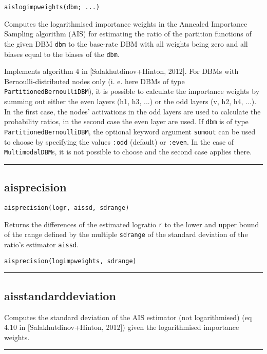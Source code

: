 \begin{verbatim}
aislogimpweights(dbm; ...)
\end{verbatim}
Computes the logarithmised importance weights in the Annealed Importance Sampling algorithm (AIS) for estimating the ratio of the partition functions of the given DBM \texttt{dbm} to the base-rate DBM with all weights being zero and all biases equal to the biases of the \texttt{dbm}.

Implements algorithm 4 in [Salakhutdinov+Hinton, 2012]. For DBMs with Bernoulli-distributed nodes only (i. e. here DBMs of type \texttt{PartitionedBernoulliDBM}), it is possible to calculate the importance weights by summing out either the even layers (h1, h3, ...) or the odd layers (v, h2, h4, ...). In the first case, the nodes' activations in the odd layers are used to calculate the probability ratios, in the second case the even layer are used. If \texttt{dbm} is of type \texttt{PartitionedBernoulliDBM}, the optional keyword argument \texttt{sumout} can be used to choose by specifying the values \texttt{:odd} (default) or \texttt{:even}. In the case of \texttt{MultimodalDBM}s, it is not possible to choose and the second case applies there.

\noindent\rule{\textwidth}{1pt}
\subsection*{aisprecision}
\begin{verbatim}
aisprecision(logr, aissd, sdrange)
\end{verbatim}
Returns the differences of the estimated logratio \texttt{r} to the lower and upper bound of the range defined by the multiple \texttt{sdrange} of the standard deviation of the ratio's estimator \texttt{aissd}.

\begin{verbatim}
aisprecision(logimpweights, sdrange)
\end{verbatim}
\noindent\rule{\textwidth}{1pt}
\subsection*{aisstandarddeviation}
Computes the standard deviation of the AIS estimator (not logarithmised) (eq 4.10 in [Salakhutdinov+Hinton, 2012]) given the logarithmised importance weights.

\noindent\rule{\textwidth}{1pt}
